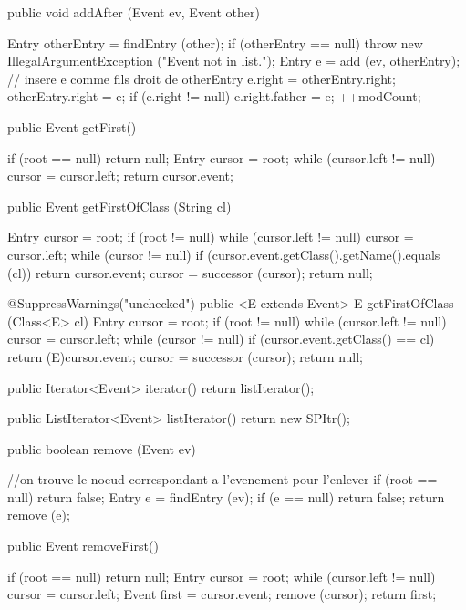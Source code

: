 \begin{hide}
\begin{code}
   public void addAfter (Event ev, Event other)\begin{hide} {
      Entry otherEntry = findEntry (other);
      if (otherEntry == null)
         throw new IllegalArgumentException ("Event not in list.");
      Entry e = add (ev, otherEntry);
      // insere e comme fils droit de otherEntry
      e.right = otherEntry.right;
      otherEntry.right = e;
      if (e.right != null)
         e.right.father = e;
      ++modCount;
   }\end{hide}

   public Event getFirst()\begin{hide} {
      if (root == null)
         return null;
      Entry cursor = root;
      while (cursor.left != null)
         cursor = cursor.left;
      return cursor.event;
   }\end{hide}

   public Event getFirstOfClass (String cl)\begin{hide} {
      Entry cursor = root;
      if (root != null)
         while (cursor.left != null)
            cursor = cursor.left;
      while (cursor != null) {
         if (cursor.event.getClass().getName().equals (cl))
            return cursor.event;
         cursor = successor (cursor);
      }
      return null;
   }

   @SuppressWarnings("unchecked")
   public <E extends Event> E getFirstOfClass (Class<E> cl) {
      Entry cursor = root;
      if (root != null)
         while (cursor.left != null)
            cursor = cursor.left;
      while (cursor != null) {
         if (cursor.event.getClass() == cl)
            return (E)cursor.event;
         cursor = successor (cursor);
      }
      return null;
   }

   public Iterator<Event> iterator() {
      return listIterator();
   }

   public ListIterator<Event> listIterator() {
      return new SPItr();
   }\end{hide}

   public boolean remove (Event ev)\begin{hide} {
      //on trouve le noeud correspondant a l'evenement pour l'enlever
      if (root == null)
         return false;
      Entry e = findEntry (ev);
      if (e == null)
         return false;
      return remove (e);
   }\end{hide}

   public Event removeFirst()\begin{hide} {
      if (root == null)
         return null;
      Entry cursor = root;
      while (cursor.left != null)
         cursor = cursor.left;
      Event first = cursor.event;
      remove (cursor);
      return first;
   }\end{hide}


\end{code}
\end{hide}
